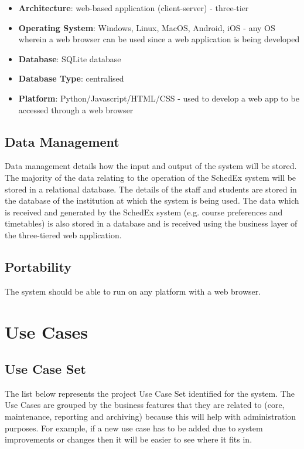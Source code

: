 \documentclass{article}
\begin{document}
\begin{itemize}
\item \textbf{Architecture}: web-based application (client-server) - three-tier
\item \textbf{Operating System}: Windows, Linux, MacOS, Android, iOS - any OS wherein a web browser can be used since a web application is being developed
\item \textbf{Database}: SQLite database
\item \textbf{Database Type}: centralised
\item \textbf{Platform}: Python/Javascript/HTML/CSS - used to develop a web app to be accessed through a web browser
\end{itemize}

\subsection{Data Management}

Data management details how the input and output of the system will be stored. The majority of the data relating to the operation of the SchedEx system will be stored in a relational database. The details of the staff and students are stored in the database of the institution at which the system is being used. The data which is received and generated by the SchedEx system (e.g. course preferences and timetables) is also stored in a database and is received using the business layer of the three-tiered web application.

\subsection{Portability}

The system should be able to run on any platform with a web browser.

\section{Use Cases}

\subsection{Use Case Set}

The list below represents the project Use Case Set identified for the system. The Use Cases are grouped by the business features that they are related to (core, maintenance, reporting and archiving) because this will help with administration purposes. For example, if a new use case has to be added due to system improvements or changes then it will be easier to see where it fits in.
\end{document}
